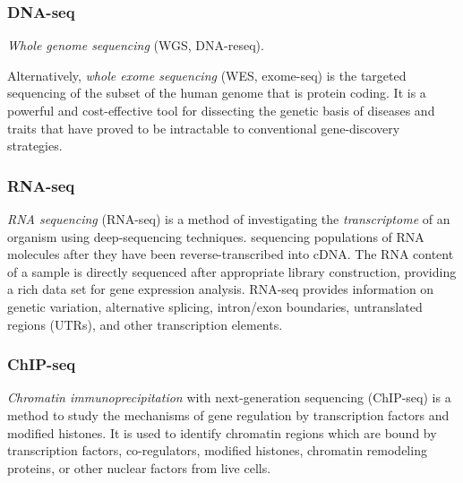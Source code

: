 \subsubsection{DNA-seq}

\emph{Whole genome sequencing} (WGS, DNA-reseq).

Alternatively, \emph{whole exome sequencing} (WES, exome-seq) is the targeted sequencing of the subset of the human genome that is protein coding.
It is a powerful and cost-effective tool for dissecting the genetic basis of diseases and traits that have proved to be intractable to conventional gene-discovery strategies.


\subsubsection{RNA-seq}
\emph{RNA sequencing} (RNA-seq) is a method of investigating the \emph{transcriptome} of an organism using deep-sequencing techniques.
sequencing populations of RNA molecules after they have been reverse-transcribed into cDNA.
The RNA content of a sample is directly sequenced after appropriate library construction, providing a rich data set for gene expression analysis.
RNA-seq provides information on genetic variation, alternative splicing, intron/exon boundaries, untranslated regions (UTRs), and other transcription elements.

\subsubsection{ChIP-seq}
\emph{Chromatin immunoprecipitation} with next-generation sequencing (ChIP-seq) is a method to study the mechanisms of gene regulation by transcription factors and modified histones.
It is used to identify chromatin regions which are bound by transcription factors, co-regulators, modified histones, chromatin remodeling proteins, or other nuclear factors from live cells.



